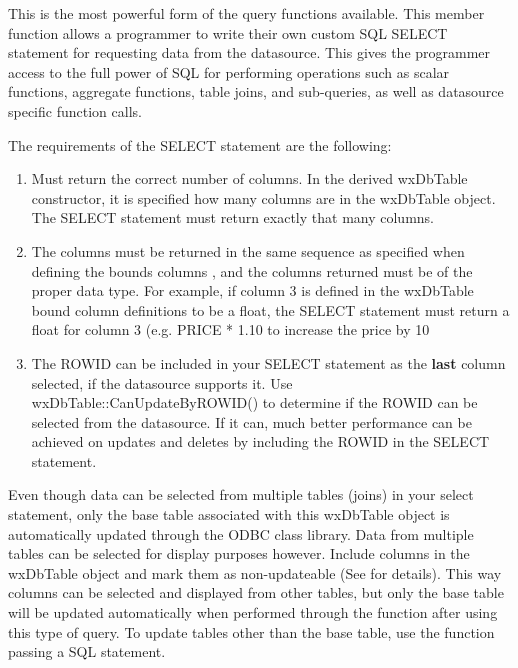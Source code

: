 


This is the most powerful form of the query functions available.  This member
function allows a programmer to write their own custom SQL SELECT statement
for requesting data from the datasource.  This gives the programmer access
to the full power of SQL for performing operations such as scalar functions,
aggregate functions, table joins, and sub-queries, as well as datasource
specific function calls.

The requirements of the SELECT statement are the following:

\begin{enumerate}
\item Must return the correct number of columns.  In the derived
wxDbTable constructor, it is specified how many columns are in
the wxDbTable object. The SELECT statement must return exactly
that many columns.
\item The columns must be returned in the same sequence as specified
when defining the bounds columns ,
and the columns returned must be of the proper data type.  For
example, if column 3 is defined in the wxDbTable bound column
definitions to be a float, the SELECT statement must return a
float for column 3 (e.g. PRICE * 1.10 to increase the price by
10%
\item The ROWID can be included in your SELECT statement as the {\bf last}
column selected, if the datasource supports it.  Use
wxDbTable::CanUpdateByROWID() to determine if the ROWID can be
selected from the datasource.  If it can, much better
performance can be achieved on updates and deletes by including
the ROWID in the SELECT statement.
\end{enumerate}

Even though data can be selected from multiple tables (joins) in your select
statement, only the base table associated with this wxDbTable object
is automatically updated through the ODBC class library.  Data from multiple
tables can be selected for display purposes however.  Include columns in
the wxDbTable object and mark them as non-updateable (See
 for details).  This way columns can be
selected and displayed from other tables, but only the base table will be
updated automatically when performed through the
 function after using this type of
query.  To update tables other than the base table, use the
 function passing a SQL statement.

